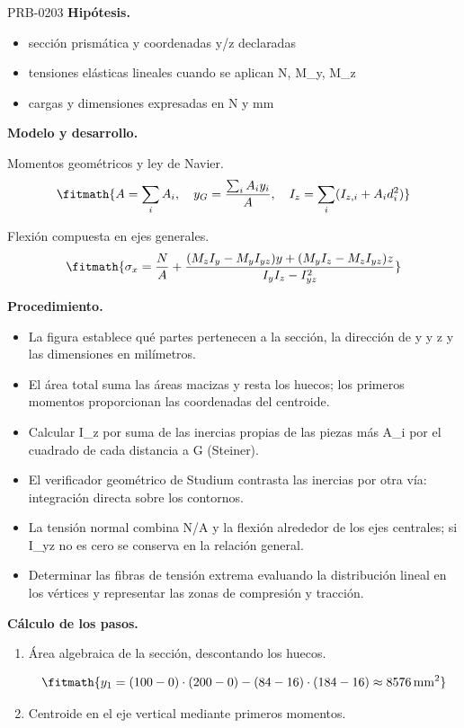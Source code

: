 \begin{studiumworked}{PRB-0203}
\textbf{Hipótesis.}\begin{itemize}\item sección prismática y coordenadas y/z declaradas
\item tensiones elásticas lineales cuando se aplican N, M\_y, M\_z
\item cargas y dimensiones expresadas en N y mm\end{itemize}

\textbf{Modelo y desarrollo.}

Momentos geométricos y ley de Navier.\[\fitmath{A = \sum_i A_i,\quad y_G = \frac{\sum_i A_i y_i}{A},\quad I_z = \sum_i (I_{z,i}+A_i d_i^2)}\]

Flexión compuesta en ejes generales.\[\fitmath{\sigma_x = \frac{N}{A}+\frac{(M_z I_y-M_y I_{yz})y+(M_y I_z-M_z I_{yz})z}{I_y I_z-I_{yz}^{2}}}\]

\textbf{Procedimiento.}\begin{itemize}\item La figura establece qué partes pertenecen a la sección, la dirección de y y z y las dimensiones en milímetros.
\item El área total suma las áreas macizas y resta los huecos; los primeros momentos proporcionan las coordenadas del centroide.
\item Calcular I\_z por suma de las inercias propias de las piezas más A\_i por el cuadrado de cada distancia a G (Steiner).
\item El verificador geométrico de Studium contrasta las inercias por otra vía: integración directa sobre los contornos.
\item La tensión normal combina N/A y la flexión alrededor de los ejes centrales; si I\_yz no es cero se conserva en la relación general.
\item Determinar las fibras de tensión extrema evaluando la distribución lineal en los vértices y representar las zonas de compresión y tracción.\end{itemize}

\textbf{Cálculo de los pasos.}

\begin{enumerate}

\item Área algebraica de la sección, descontando los huecos.

\[\fitmath{y_{1}=\left(100-0\right)\cdot \left(200-0\right)-\left(84-16\right)\cdot \left(184-16\right)\approx 8576\,\mathrm{mm^{2}}}\]

\item Centroide en el eje vertical mediante primeros momentos.


\end{enumerate}
\end{studiumworked}
